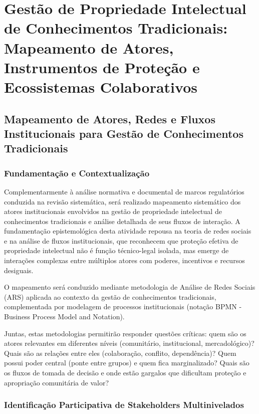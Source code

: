 \section{Gestão de Propriedade Intelectual de Conhecimentos Tradicionais: Mapeamento de Atores, Instrumentos de Proteção e Ecossistemas Colaborativos}

\subsection{Mapeamento de Atores, Redes e Fluxos Institucionais para Gestão de Conhecimentos Tradicionais}

\subsubsection{Fundamentação e Contextualização}

Complementarmente à análise normativa e documental de marcos regulatórios conduzida na revisão sistemática, será realizado mapeamento sistemático dos atores institucionais envolvidos na gestão de propriedade intelectual de conhecimentos tradicionais e análise detalhada de seus fluxos de interação. A fundamentação epistemológica desta atividade repousa na teoria de redes sociais e na análise de fluxos institucionais, que reconhecem que proteção efetiva de propriedade intelectual não é função técnico-legal isolada, mas emerge de interações complexas entre múltiplos atores com poderes, incentivos e recursos desiguais.

O mapeamento será conduzido mediante metodologia de Análise de Redes Sociais (ARS) aplicada ao contexto da gestão de conhecimentos tradicionais, complementada por modelagem de processos institucionais (notação BPMN - Business Process Model and Notation). 

Juntas, estas metodologias permitirão responder questões críticas: quem são os atores relevantes em diferentes níveis (comunitário, institucional, mercadológico)? Quais são as relações entre eles (colaboração, conflito, dependência)? Quem possui poder central (ponte entre grupos) e quem fica marginalizado? Quais são os fluxos de tomada de decisão e onde estão gargalos que dificultam proteção e apropriação comunitária de valor?

\subsubsection{Identificação Participativa de Stakeholders Multinivelados}

